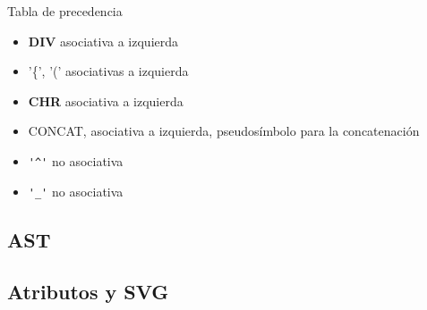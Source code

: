 Tabla de precedencia
\begin{itemize}
	\item \textbf{DIV} asociativa a izquierda 

    \item '\{', '(' asociativas a izquierda  
    \item \textbf{CHR} asociativa a izquierda 
    \item CONCAT, asociativa a izquierda, pseudosímbolo para la concatenación 
    \item \verb|'^'| no asociativa
    \item \verb|'_'| no asociativa
\end{itemize}

\subsection{AST}

\subsection{Atributos y SVG}